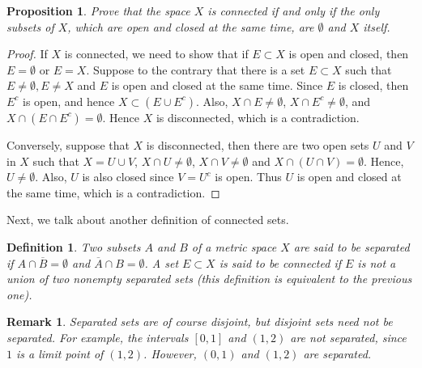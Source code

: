 \documentclass[11pt]{book}
\newtheorem{definition}{Definition}[chapter]
\newtheorem{proposition}{Proposition}[chapter]
\newtheorem{remark}{Remark}[chapter]
\theoremstyle{definition}
\numberwithin{equation}{chapter}
\begin{document}
\medskip

\begin{proposition}
Prove that the space $X$ is connected if and only if the only subsets of $X$, which are open and closed at the same time, are $\emptyset$ and $X$ itself.
\end{proposition}
\begin{proof}
If $X$ is connected, we need to show that if $E \subset X$ is open and closed, then $E = \emptyset$ or $E = X$. Suppose to the contrary that there is a set $E \subset X$ such that $E \neq \emptyset, E \neq X$ and $E$ is open and closed at the same time. Since $E$ is closed, then $E^c$ is open, and hence $X \subset (E \cup E^c)$. Also, $X \cap E \neq \emptyset$, $X \cap E^c \neq \emptyset$, and $X \cap (E \cap E^c) = \emptyset$. Hence $X$ is disconnected, which is a contradiction.

Conversely, suppose that $X$ is disconnected, then there are two open sets $U$ and $V$ in $X$ such that $X = U \cup V$, $X \cap U \neq \emptyset$, $X \cap V \neq \emptyset$ and $X \cap (U \cap V) = \emptyset$. Hence, $U \neq \emptyset$. Also, $U$ is also closed since $V = U^c$ is open. Thus $U$ is open and closed at the same time, which is a contradiction.
\end{proof}

\medskip

Next, we talk about another definition of connected sets.

\medskip

\begin{definition}
Two subsets $A$ and $B$ of a metric space $X$ are said to be separated if $A \cap \overline{B} = \emptyset$ and $\overline{A} \cap B = \emptyset$. A set $E \subset X$ is said to be connected if $E$ is not a union of two nonempty separated sets (this definition is equivalent to the previous one).
\end{definition}

\begin{remark}
Separated sets are of course disjoint, but disjoint sets need not be separated. For example, the intervals $[0,1]$ and $(1,2)$ are not separated, since $1$ is a limit point of $(1,2)$. However, $(0,1)$ and $(1,2)$ are separated.
\end{remark}

\medskip
\end{document}
